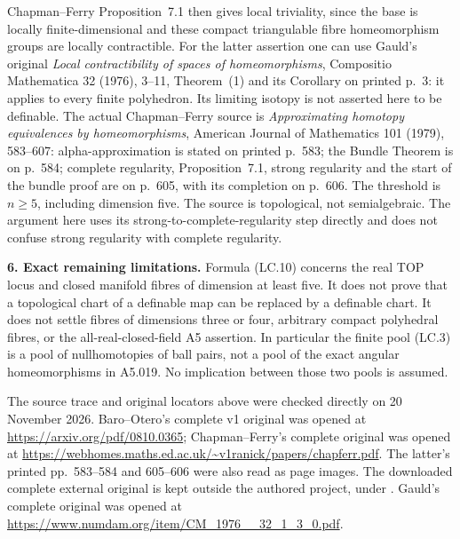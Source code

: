 Chapman--Ferry Proposition~7.1 then gives local triviality, since the
base is locally finite-dimensional and these compact triangulable fibre
homeomorphism groups are locally contractible. For the latter assertion
one can use Gauld's original \emph{Local contractibility of spaces of
homeomorphisms}, Compositio Mathematica 32 (1976), 3--11,
Theorem~(1) and its Corollary on printed p.~3: it applies to every finite
polyhedron. Its limiting isotopy is not asserted here to be definable.
The actual Chapman--Ferry source is
\emph{Approximating homotopy equivalences by homeomorphisms},
American Journal of Mathematics 101 (1979), 583--607:
alpha-approximation is stated on printed p.~583; the Bundle Theorem is
on p.~584; complete regularity, Proposition~7.1, strong regularity and
the start of the bundle proof are on p.~605, with its completion on
p.~606. The threshold is $n\ge5$, including dimension five. The source
is topological, not semialgebraic. The argument here uses its
strong-to-complete-regularity step directly and does not confuse strong
regularity with complete regularity.

\textbf{6. Exact remaining limitations.}
Formula (LC.10) concerns the real TOP locus and closed manifold fibres
of dimension at least five. It does not prove that a topological chart
of a definable map can be replaced by a definable chart. It does not
settle fibres of dimensions three or four, arbitrary compact polyhedral
fibres, or the all-real-closed-field A5 assertion. In particular the
finite pool (LC.3) is a pool of nullhomotopies of ball pairs, not a pool
of the exact angular homeomorphisms in A5.019. No implication between
those two pools is assumed.

The source trace and original locators above were checked directly on
20 November 2026. Baro--Otero's complete v1 original was opened at
\url{https://arxiv.org/pdf/0810.0365}; Chapman--Ferry's complete original
was opened at
\url{https://webhomes.maths.ed.ac.uk/~v1ranick/papers/chapferr.pdf}.
The latter's printed pp.~583--584 and 605--606 were also read as page
images. The downloaded complete external original is kept outside the
authored project, under .
Gauld's complete original was opened at
\url{https://www.numdam.org/item/CM_1976__32_1_3_0.pdf}.
